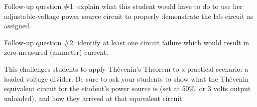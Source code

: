 \vskip 10pt

Follow-up question \#1: explain what this student would have to do to use her adjustable-voltage power source circuit to properly demonstrate the lab circuit as assigned.

\vskip 10pt

Follow-up question \#2: identify at least one circuit failure which would result in zero measured (ammeter) current.







This challenges students to apply Th\'evenin's Theorem to a practical scenario: a loaded voltage divider.  Be sure to ask your students to show what the Th\'evenin equivalent circuit for the student's power source is (set at 50\%, or 3 volts output unloaded), and how they arrived at that equivalent circuit.




